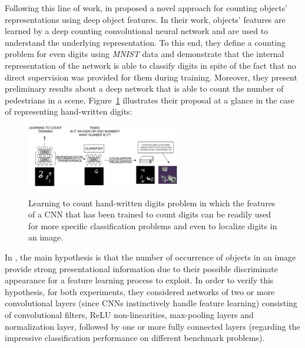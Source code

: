 Following this line of work,  in \cite{segui2015learning} proposed a novel approach for counting objects' representations using deep object features. In their work, objects' features are learned by a deep counting convolutional neural network and are used to understand the underlying representation. To this end, they define a counting problem for even digits using \textit{MNIST} data and demonstrate that the internal representation of the network is able to classify digits in spite of the fact that no direct supervision was provided for them during training. Moreover, they present preliminary results about a deep network that is able to count the number of pedestrians in a scene\cite{segui2015learning}. Figure~\ref{fig:santimnist} illustrates their proposal at a glance in the case of representing hand-written digits:
\begin{figure}[h!]
	\centering
	{\includegraphics[width=0.6\textwidth]{images/santimnist}}
	\caption{Learning to count hand-written digits problem in which the features of a CNN that has been trained to count digits can be readily used for more specific classification problems and even to localize digits in an image\cite{segui2015learning}.}
	\label{fig:santimnist}
\end{figure}


In \cite{segui2015learning}, the main hypothesis is that the number of occurrence of objects in an image provide strong presentational information due to their possible discriminate appearance for a feature learning process to exploit. In order to verify this hypothesis, for both experiments, they considered networks of two or more convolutional layers (since CNNs instinctively handle feature learning\cite{lecun1989backpropagation}) consisting of convolutional filters, ReLU non-linearities, max-pooling layers and normalization layer,   followed by one or more fully connected layers (regarding the impressive classification performance on different benchmark problems\cite{krizhevsky2012imagenet, Karpathy_2014_CVPR, ciresan2011flexible})\cite{segui2015learning}. 







  



